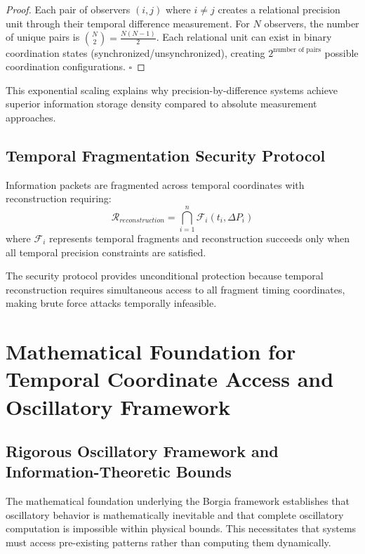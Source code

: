 ﻿\documentclass[11pt,a4paper]{article}
\begin{document}
\begin{proof}
Each pair of observers $(i,j)$ where $i \neq j$ creates a relational precision unit through their temporal difference measurement. For $N$ observers, the number of unique pairs is $\binom{N}{2} = \frac{N(N-1)}{2}$. Each relational unit can exist in binary coordination states (synchronized/unsynchronized), creating $2^{\text{number of pairs}}$ possible coordination configurations. $\square$
\end{proof}

This exponential scaling explains why precision-by-difference systems achieve superior information storage density compared to absolute measurement approaches.

\subsection{Temporal Fragmentation Security Protocol}

\begin{definition}
Information packets are fragmented across temporal coordinates with reconstruction requiring:
\begin{equation}
\mathcal{R}_{reconstruction} = \bigcap_{i=1}^{n} \mathcal{F}_i(t_i, \Delta P_i)
\end{equation}
where $\mathcal{F}_i$ represents temporal fragments and reconstruction succeeds only when all temporal precision constraints are satisfied.
\end{definition}

The security protocol provides unconditional protection because temporal reconstruction requires simultaneous access to all fragment timing coordinates, making brute force attacks temporally infeasible.

\section{Mathematical Foundation for Temporal Coordinate Access and Oscillatory Framework}

\subsection{Rigorous Oscillatory Framework and Information-Theoretic Bounds}

The mathematical foundation underlying the Borgia framework establishes that oscillatory behavior is mathematically inevitable and that complete oscillatory computation is impossible within physical bounds. This necessitates that systems must access pre-existing patterns rather than computing them dynamically.
\end{document}
